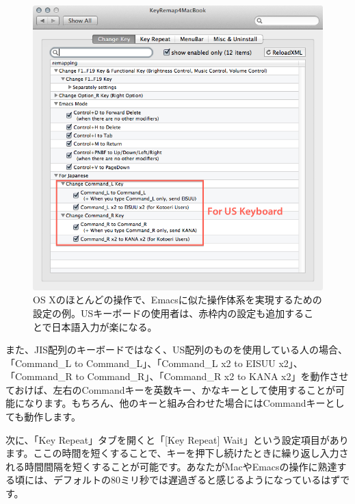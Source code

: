 \begin{figure}
  \centering
  \includegraphics[scale=0.35]{fig/KeyRemap4MacBook1.png}
  \caption{OS Xのほとんどの操作で、Emacsに似た操作体系を実現するための設定の例。USキーボードの使用者は、赤枠内の設定も追加することで日本語入力が楽になる。}
  \label{fig_KeyRemap4MacBook1_png}
\end{figure}

また、JIS配列のキーボードではなく、US配列のものを使用している人の場合、「Command\_L to Command\_L」、「Command\_L x2 to EISUU x2」、「Command\_R to Command\_R」、「Command\_R x2 to KANA x2」を動作させておけば、左右のCommandキーを英数キー、かなキーとして使用することが可能になります。もちろん、他のキーと組み合わせた場合にはCommandキーとしても動作します。

次に、「Key Repeat」タブを開くと「[Key Repeat] Wait」という設定項目があります。ここの時間を短くすることで、キーを押下し続けたときに繰り返し入力される時間間隔を短くすることが可能です。あなたがMacやEmacsの操作に熟達する頃には、デフォルトの$80$ミリ秒では遅過ぎると感じるようになっているはずです。


